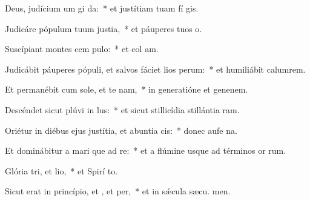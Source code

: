 \item Deus, judícium um gi da:~* et justítiam tuam fí gis.
\item Judicáre pópulum tuum  justia,~* et páuperes tuos  o.
\item Suscípiant montes cem pulo:~* et col am.
\item Judicábit páuperes pópuli, et salvos fáciet lios perum:~* et humiliábit calumrem.
\item Et permanébit cum sole, et te nam,~* in generatióne et genenem.
\item Descéndet sicut plúvi in lus:~* et sicut stillicídia stillántia  ram.
\item Oriétur in diébus ejus justítia, et abuntia cis:~* donec aufe na.
\item Et dominábitur a mari que ad re:~* et a flúmine usque ad términos or rum.
\item Glória tri, et lio,~* et Spirí to.
\item Sicut erat in princípio, et , et per,~* et in sǽcula sæcu. men.
